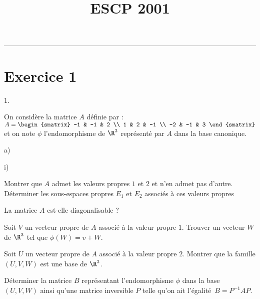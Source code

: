 \documentclass[11pt]{article}%
\title{\bf \vspace{-1cm} ESCP 2001} %
\author{} %
\date{} %
\begin{document}
\maketitle %
\vspace{-1.2cm}\hrule %
\thispagestyle{fancy}

\vspace*{.4cm}


\section*{Exercice 1}

\begin{noliste}{1.}
 \setlength{\itemsep}{4mm}
\item On considère la matrice $A$ définie par : $A = 
\begin{smatrix}
-1 & -1 & 2 \\
1 & 2 & -1 \\
-2 & -1 & 3
\end{smatrix}
$ et on note $\phi $ l'endomorphisme de $\R^{3}$ représenté par $A$
dans la base canonique.

\begin{noliste}{a)}
 \setlength{\itemsep}{2mm}
\item 

\begin{nonoliste}{i)}
\item Montrer que $A$ admet les valeurs propres $1$ et $2$ et n'en
admet pas
d'autre.\\
Déterminer les sous-espaces propres $E_{1}$ et $E_{2}$ associés à ces
valeurs propres

\item La matrice $A$ est-elle diagonalisable ?
\end{nonoliste}

\item Soit $V$ un vecteur propre de $A$ associé à la valeur propre $1$.
Trouver un vecteur $W$ de $\R^{3}$ tel que $\phi (W) = v + W$.

\item Soit $U$ un vecteur propre de $A$ associé à la valeur propre $2$.
Montrer que la famille $(U,V,W)$ est une base de $\R^{3}$.

\item Déterminer la matrice $B$ représentant l'endomorphisme $\phi $
dans la
base $(U,V,W)$ ainsi qu'une matrice inversible $P$ telle qu'on ait
l'égalité\ $B = P^{-1}AP$.
\end{noliste}


\end{noliste}
\end{document}
